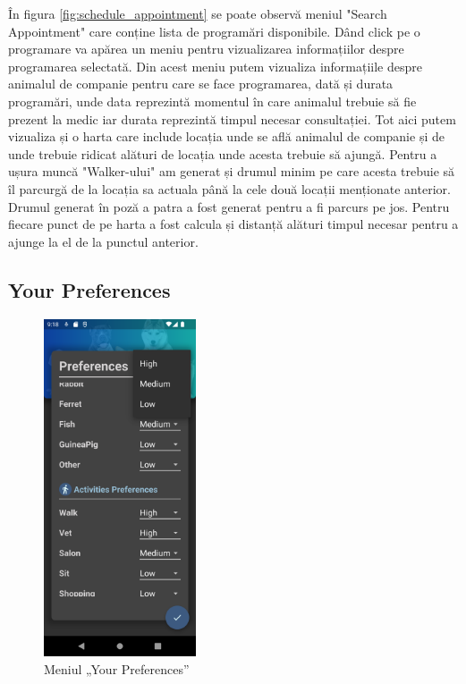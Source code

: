 În figura \ref{fig:schedule_appointment} se poate observă meniul "Search Appointment" care conține lista de programări disponibile. Dând click pe o programare va apărea un meniu pentru vizualizarea informațiilor despre programarea selectată. Din acest meniu putem vizualiza informațiile despre animalul de companie pentru care se face programarea, dată și durata programări, unde data reprezintă momentul în care animalul trebuie să fie prezent la medic iar durata reprezintă timpul necesar consultației. Tot aici putem vizualiza și o harta care include locația unde se află animalul de companie și de unde trebuie ridicat alături de locația unde acesta trebuie să ajungă. Pentru a ușura muncă "Walker-ului" am generat și drumul minim pe care acesta trebuie să îl parcurgă de la locația sa actuala până la cele două locații menționate anterior. Drumul generat în poză a patra a fost generat pentru a fi parcurs pe jos. Pentru fiecare punct de pe harta a fost calcula și distanță alături timpul necesar pentru a ajunge la el de la punctul anterior.

\subsection{Your Preferences}

\begin{figure}
    \centering
    \includegraphics[width=0.4\textwidth]{images/screenshots/preferences.png}
    \caption{Meniul \newline „Your Preferences”}
    \label{fig:your_preferences}
\end{figure}

